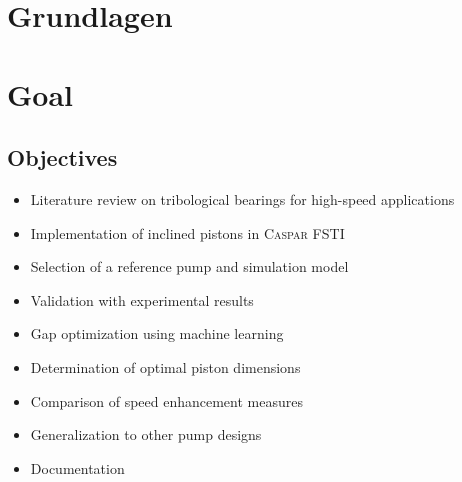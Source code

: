   {\chapter{Grundlagen}}
  {\chapter{Goal}}
\label{sec:Goal}

\section{Objectives}
\begin{itemize}
    \item Literature review on tribological bearings for high-speed applications
    \item Implementation of inclined pistons in \textsc{Caspar FSTI}
    \item Selection of a reference pump and simulation model
    \item Validation with experimental results
    \item Gap optimization using machine learning
    \item Determination of optimal piston dimensions
    \item Comparison of speed enhancement measures
    \item Generalization to other pump designs
    \item Documentation
\end{itemize}
